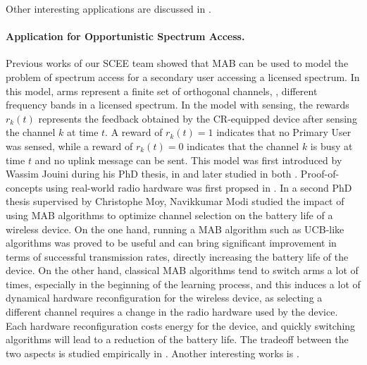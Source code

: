 

Other interesting applications are discussed in \cite{bouneffouf2019survey}.


\paragraph{Application for Opportunistic Spectrum Access.}
%
Previous works of our SCEE team showed that MAB can be used to model the problem of spectrum access for a secondary user accessing a licensed spectrum.
In this model, arms represent a finite set of orthogonal channels, \ie, different frequency bands in a licensed spectrum.
In the model with sensing, the rewards $r_k(t)$ represents the feedback obtained by the CR-equipped device after sensing the channel $k$ at time $t$.
A reward of $r_k(t) = 1$ indicates that no Primary User was sensed, while a reward of $r_k(t)=0$ indicates that the channel $k$ is busy at time $t$ and no uplink message can be sent.
%
This model was first introduced by Wassim Jouini during his PhD thesis,
in \cite{Jouini09} and later studied in both \cite{Jouini10,Jouini12}.
Proof-of-concepts using real-world radio hardware was first propsed in \cite{MoyWSR2014,RobertSDR2014}.
In a second PhD thesis supervised by Christophe Moy, Navikkumar Modi studied the impact
of using MAB algorithms to optimize channel selection
on the battery life of a wireless device.
On the one hand, running a MAB algorithm such as UCB-like algorithms was proved to be useful and can bring significant improvement in terms of successful transmission rates, directly increasing the battery life of the device.
On the other hand, classical MAB algorithms tend to switch arms a lot of times, especially in the beginning of the learning process, and this induces a lot of dynamical hardware reconfiguration for the wireless device, as selecting a different channel requires a change in the radio hardware used by the device.
Each hardware reconfiguration costs energy for the device, and quickly switching algorithms will lead to a reduction of the battery life.
The tradeoff between the two aspects is studied empirically in
\cite{modiDemo2016}.
%
Another interesting works is \cite{Modi17QoS}.


